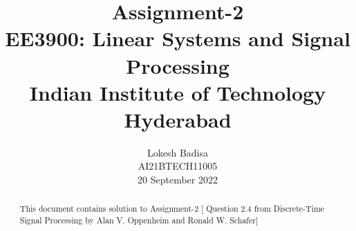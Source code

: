 \documentclass[journal,12pt,twocolumn]{IEEEtran}
\numberwithin{equation}{section}
\begin{document}
                             
\title{ Assignment-2 \\ \Large EE3900: Linear Systems and Signal Processing \\ \large Indian Institute of Technology Hyderabad}
\author{Lokesh Badisa \\ \normalsize AI21BTECH11005 \\ \vspace*{20pt} \normalsize 20 September 2022}   
\maketitle 
 
\begin{abstract}
 This document contains solution to Assignment-2 [ Question 2.4 from Discrete-Time Signal Processing by Alan V. Oppenheim and Ronald W. Schafer]
 \end{abstract}
\end{document}
